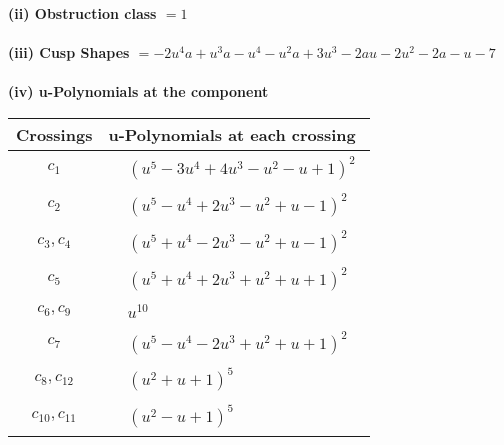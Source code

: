 \documentclass[1p]{elsarticle_modified}
\theoremstyle{definition}
\begin{document}
\flushleft \textbf{(ii) Obstruction class $= 1$}\\~\\
\flushleft \textbf{(iii) Cusp Shapes $= -2 u^4 a+u^3 a- u^4- u^2 a+3 u^3-2 a u-2 u^2-2 a- u-7$}\\~\\
\newpage\renewcommand{\arraystretch}{1}
\flushleft \textbf{(iv) u-Polynomials at the component}\newline \\
\begin{tabular}{m{50pt}|m{274pt}}
Crossings & \hspace{64pt}u-Polynomials at each crossing \\
\hline $$\begin{aligned}c_{1}\end{aligned}$$&$\begin{aligned}
&(u^5-3 u^4+4 u^3- u^2- u+1)^2
\end{aligned}$\\
\hline $$\begin{aligned}c_{2}\end{aligned}$$&$\begin{aligned}
&(u^5- u^4+2 u^3- u^2+u-1)^2
\end{aligned}$\\
\hline $$\begin{aligned}c_{3},c_{4}\end{aligned}$$&$\begin{aligned}
&(u^5+u^4-2 u^3- u^2+u-1)^2
\end{aligned}$\\
\hline $$\begin{aligned}c_{5}\end{aligned}$$&$\begin{aligned}
&(u^5+u^4+2 u^3+u^2+u+1)^2
\end{aligned}$\\
\hline $$\begin{aligned}c_{6},c_{9}\end{aligned}$$&$\begin{aligned}
&u^{10}
\end{aligned}$\\
\hline $$\begin{aligned}c_{7}\end{aligned}$$&$\begin{aligned}
&(u^5- u^4-2 u^3+u^2+u+1)^2
\end{aligned}$\\
\hline $$\begin{aligned}c_{8},c_{12}\end{aligned}$$&$\begin{aligned}
&(u^2+u+1)^5
\end{aligned}$\\
\hline $$\begin{aligned}c_{10},c_{11}\end{aligned}$$&$\begin{aligned}
&(u^2- u+1)^5
\end{aligned}$\\
\hline
\end{tabular}\\~\\
\end{document}
